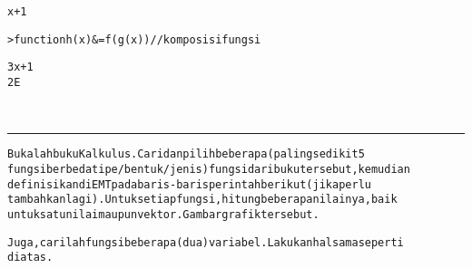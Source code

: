 \documentclass[a4paper,10pt]{article}
\newenvironment{eulernotebook}{}{}
\newenvironment{eulercomment}
{\color{green}\vspace{5pt}%
\parskip=0pt\parsep=0pt\topsep=0pt%
\goodbreak\begin{alltt}\ignorespaces}
{\end{alltt}\vspace{5pt}}
\newenvironment{eulerprompt}
{\color{red}\vspace{5pt plus 20pt}%
\begin{shaded}\parskip=0pt\parsep=0pt\topsep=0pt%
\begin{alltt}\ignorespaces}
{\end{alltt}\end{shaded}\vspace{5pt}}
\newenvironment{euleroutput}
{\color{black}\vspace{5pt}%
\parskip=0pt\parsep=0pt\topsep=0pt%
\begin{alltt}\ignorespaces}
{\end{alltt}\vspace{5pt}}
\newcommand\eulerheading[1]{%
\begin{samepage}%
\color{green}\pagebreak{\Large\bf\hfill#1}\\[-5pt]%
\rule{\linewidth}{1pt}\nopagebreak\vspace{16pt}%
\end{samepage}\nopagebreak}
\begin{document}
\begin{eulernotebook}
\begin{euleroutput}
                                 3 x + 1
  
\end{euleroutput}
\begin{eulerprompt}
>function h(x) &= f(g(x)) // komposisi fungsi
\end{eulerprompt}
\begin{euleroutput}
  
                                   3 x + 1
                                2 E
  
\end{euleroutput}
\eulerheading{Latihan}
\begin{eulercomment}
Bukalah buku Kalkulus. Cari dan pilih beberapa (paling sedikit 5
fungsi berbeda tipe/bentuk/jenis) fungsi dari buku tersebut, kemudian
definisikan di EMT pada baris-baris perintah berikut (jika perlu
tambahkan lagi). Untuk setiap fungsi, hitung beberapa nilainya, baik
untuk satu nilai maupun vektor. Gambar grafik tersebut.

Juga, carilah fungsi beberapa (dua) variabel. Lakukan hal sama seperti
di atas.


\end{eulercomment}
\end{eulernotebook}
\end{document}
